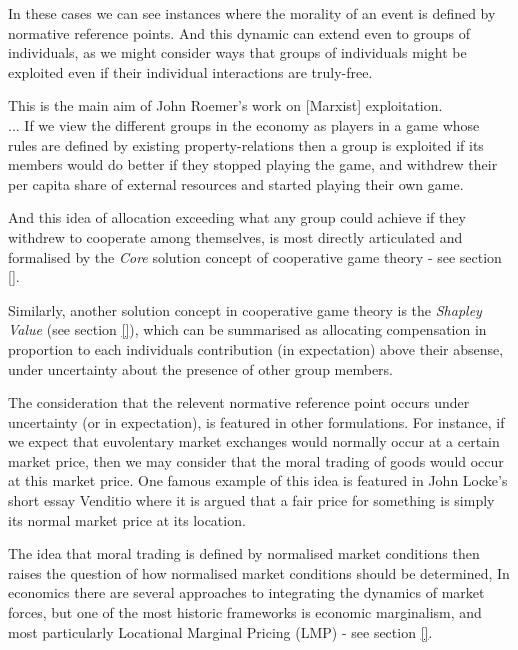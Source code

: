 In these cases we can see instances where the morality of an event is defined by normative reference points. And this dynamic can extend even to groups of individuals, as we might consider ways that groups of individuals might be exploited even if their individual interactions are truly-free.
\begin{displayquote}
This is the main aim of John Roemer's work on [Marxist] exploitation.\\... %
If we view the different groups in the economy as players in a game whose rules are defined by existing property-relations then a group is exploited if its members would do better if they stopped playing the game, and withdrew their per capita share of external resources and started playing their own game.\cite{kymlicka2002contemporary}
\end{displayquote}
And this idea of allocation exceeding what any group could achieve if they withdrew to cooperate among themselves, is most directly articulated and formalised by the \textit{Core} solution concept of cooperative game theory - see section \ref{}.

Similarly, another solution concept in cooperative game theory is the \textit{Shapley Value} (see section \ref{}), which can be summarised as allocating compensation in proportion to each individuals contribution (in expectation) above their absense, under uncertainty about the presence of other group members.

The consideration that the relevent normative reference point occurs under uncertainty (or in expectation), is featured in other formulations.
For instance, if we expect that euvolentary market exchanges would normally occur at a certain market price, then we may consider that the moral trading of goods would occur at this market price.
One famous example of this idea is featured in John Locke's short essay Venditio \cite{locke2003locke} where it is argued that a fair price for something is simply its normal market price at its location.

The idea that moral trading is defined by normalised market conditions then raises the question of how normalised market conditions should be determined,
In economics there are several approaches to integrating the dynamics of market forces, but one of the most historic frameworks is economic marginalism, and most particularly Locational Marginal Pricing (LMP) - see section \ref{}.\\

